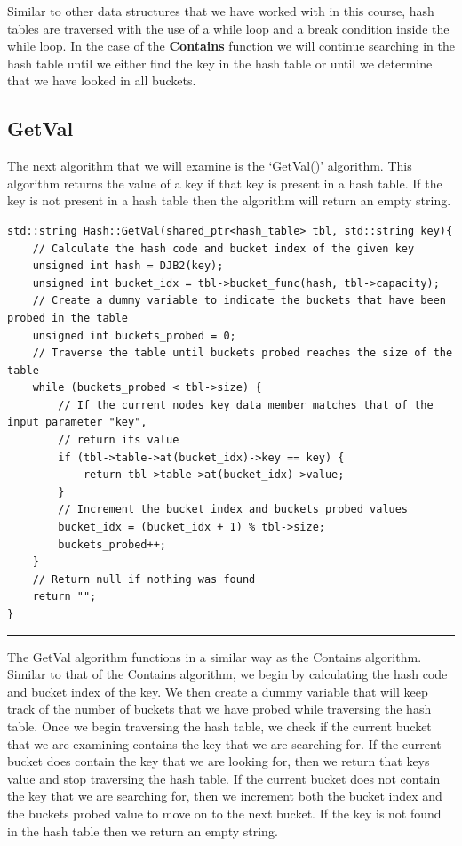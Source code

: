 \documentclass[a4paper,9pt]{article}
\newcommand{\horizontalline}{\noindent \rule{\textwidth}{0.5pt}\par}
\begin{document}
\noindent Similar to other data structures that we have worked with in this course, hash tables are traversed with the use of a while loop and a break condition inside the while loop. In
the case of the \textbf{Contains} function we will continue searching in the hash table until we either find the key in the hash table or until we determine that we have looked in all buckets.

\subsection*{GetVal}

The next algorithm that we will examine is the `GetVal()' algorithm. This algorithm returns the value of a key if that key is present in a hash table. If the key is not present in a hash table
then the algorithm will return an empty string.

\begin{highlight}

\begin{verbatim}
std::string Hash::GetVal(shared_ptr<hash_table> tbl, std::string key){
    // Calculate the hash code and bucket index of the given key
    unsigned int hash = DJB2(key);
    unsigned int bucket_idx = tbl->bucket_func(hash, tbl->capacity);
    // Create a dummy variable to indicate the buckets that have been probed in the table
    unsigned int buckets_probed = 0;
    // Traverse the table until buckets probed reaches the size of the table
    while (buckets_probed < tbl->size) {
        // If the current nodes key data member matches that of the input parameter "key", 
        // return its value
        if (tbl->table->at(bucket_idx)->key == key) {
            return tbl->table->at(bucket_idx)->value;
        }
        // Increment the bucket index and buckets probed values
        bucket_idx = (bucket_idx + 1) % tbl->size;
        buckets_probed++;
    }
    // Return null if nothing was found
    return "";
}
\end{verbatim}

\horizontalline

The GetVal algorithm functions in a similar way as the Contains algorithm. Similar to that of the Contains algorithm, we begin by calculating the hash code and bucket index of the key. We then
create a dummy variable that will keep track of the number of buckets that we have probed while traversing the hash table. Once we begin traversing the hash table, we check if the current bucket
that we are examining contains the key that we are searching for. If the current bucket does contain the key that we are looking for, then we return that keys value and stop traversing the hash
table. If the current bucket does not contain the key that we are searching for, then we increment both the bucket index and the buckets probed value to move on to the next bucket. If the key is
not found in the hash table then we return an empty string.

\end{highlight}
\end{document}

